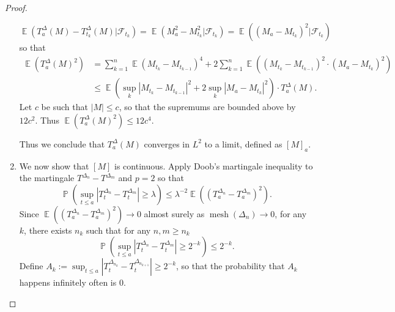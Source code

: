 \documentclass[11pt, a4paper]{memoir}
\theoremstyle{change}
\theoremstyle{plain}
\theoremstyle{nonumberplain}
\newtheorem{proof}{Proof}
\DeclareMathOperator{\pr}{{\mathbb{P}}}
\DeclareMathOperator{\E}{{\mathbb{E}}}
\DeclareMathOperator{\mesh}{mesh}
\numberwithin{equation}{section}
\begin{document}
\begin{proof}
\begin{enumerate}[nl]
\begin{equation*}
                \E(T_a^\Delta(M)-T_{t_k}^\Delta(M)|\mathcal{F}_{t_k}) = \E(M_a^2-M_{t_k}^2|\mathcal{F}_{t_k}) = \E((M_a-M_{t_k})^2|\mathcal{F}_{t_k})
            \end{equation*}
            so that
            \begin{align*}
                \E(T_a^\Delta(M)^2) &= \sum_{k=1}^n\E(M_{t_k}-M_{t_{k-1}})^4+2\sum_{k=1}^n\E((M_{t_k}-M_{t_{k-1}})^2\cdot(M_a-M_{t_k})^2)\\
                                    &\leq\E\left(\sup_k|M_{t_k}-M_{t_{k-1}}|^2+2\sup_k|M_a-M_{t_k}|^2\right)\cdot T_a^\Delta(M).
            \end{align*}
            Let $c$ be such that $|M|\leq c$, so that the supremums are bounded above by $12c^2$.
            Thus $\E(T_a^\Delta(M)^2)\leq 12c^4$.

            Thus we conclude that $T_a^\Delta(M)$ converges in $L^2$ to a limit, defined as $[M]_a$.
        \item We now show that $[M]$ is continuous.
            Apply Doob's martingale inequality to the martingale $T^{\Delta_n}-T^{\Delta_m}$ and $p=2$ so that
            \begin{equation*}
                \pr(\sup_{t\leq a}|T_t^{\Delta_n}-T_t^{\Delta_m}|\geq\lambda)\leq\lambda^{-2}\E((T_a^{\Delta_n}-T_a^{\Delta_m})^2).
            \end{equation*}
            Since $\E((T_a^{\Delta_n}-T_a^{\Delta_m})^2)\to 0$ almost surely as $\mesh(\Delta_n)\to 0$, for any $k$, there exists $n_k$ such that for any $n,m\geq n_k$
            \begin{equation*}
                \pr(\sup_{t\leq a}|T_t^{\Delta_n}-T_t^{\Delta_m}|\geq 2^{-k})\leq 2^{-k}.
            \end{equation*}
            Define $A_k:=\sup_{t\leq a}|T_t^{\Delta_{n_k}}-T_t^{\Delta_{n_{k+1}}}|\geq 2^{-k}$, so that the probability that $A_k$ happens infinitely often is 0.


\end{enumerate}
\end{proof}
\end{document}
